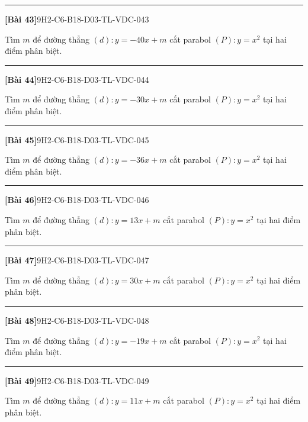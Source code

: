 \documentclass[12pt,a4paper]{article}
\newif\ifloigiai
\newenvironment{cauhoi}[2]{%
  \par\medskip\noindent\rule{\textwidth}{0.4pt}\par\nopagebreak
  \noindent\textbf{[#1]}\hfill{\scriptsize\ttfamily #2}\par\nopagebreak\smallskip}{\par}
\newcommand{\loigiai}[1]{\ifloigiai\par\smallskip\noindent\textit{Lời giải.} #1\par\fi}
\begin{document}
\begin{cauhoi}{Bài 43}{9H2-C6-B18-D03-TL-VDC-043}
Tìm $m$ để đường thẳng $(d): y=-40x+m$ cắt parabol $(P): y=x^{2}$ tại hai điểm phân biệt.
\loigiai{Phương trình hoành độ giao điểm $x^{2}+40x-m=0$. Để $(d)$ cắt $(P)$ tại hai điểm phân biệt cần $\Delta=1600+4m>0$, suy ra $m>-400$.}
\end{cauhoi}
\begin{cauhoi}{Bài 44}{9H2-C6-B18-D03-TL-VDC-044}
Tìm $m$ để đường thẳng $(d): y=-30x+m$ cắt parabol $(P): y=x^{2}$ tại hai điểm phân biệt.
\loigiai{Phương trình hoành độ giao điểm $x^{2}+30x-m=0$. Để $(d)$ cắt $(P)$ tại hai điểm phân biệt cần $\Delta=900+4m>0$, suy ra $m>-225$.}
\end{cauhoi}
\begin{cauhoi}{Bài 45}{9H2-C6-B18-D03-TL-VDC-045}
Tìm $m$ để đường thẳng $(d): y=-36x+m$ cắt parabol $(P): y=x^{2}$ tại hai điểm phân biệt.
\loigiai{Phương trình hoành độ giao điểm $x^{2}+36x-m=0$. Để $(d)$ cắt $(P)$ tại hai điểm phân biệt cần $\Delta=1296+4m>0$, suy ra $m>-324$.}
\end{cauhoi}
\begin{cauhoi}{Bài 46}{9H2-C6-B18-D03-TL-VDC-046}
Tìm $m$ để đường thẳng $(d): y=13x+m$ cắt parabol $(P): y=x^{2}$ tại hai điểm phân biệt.
\loigiai{Phương trình hoành độ giao điểm $x^{2}-13x-m=0$. Để $(d)$ cắt $(P)$ tại hai điểm phân biệt cần $\Delta=169+4m>0$, suy ra $m>-\dfrac{169}{4}$.}
\end{cauhoi}
\begin{cauhoi}{Bài 47}{9H2-C6-B18-D03-TL-VDC-047}
Tìm $m$ để đường thẳng $(d): y=30x+m$ cắt parabol $(P): y=x^{2}$ tại hai điểm phân biệt.
\loigiai{Phương trình hoành độ giao điểm $x^{2}-30x-m=0$. Để $(d)$ cắt $(P)$ tại hai điểm phân biệt cần $\Delta=900+4m>0$, suy ra $m>-225$.}
\end{cauhoi}
\begin{cauhoi}{Bài 48}{9H2-C6-B18-D03-TL-VDC-048}
Tìm $m$ để đường thẳng $(d): y=-19x+m$ cắt parabol $(P): y=x^{2}$ tại hai điểm phân biệt.
\loigiai{Phương trình hoành độ giao điểm $x^{2}+19x-m=0$. Để $(d)$ cắt $(P)$ tại hai điểm phân biệt cần $\Delta=361+4m>0$, suy ra $m>-\dfrac{361}{4}$.}
\end{cauhoi}
\begin{cauhoi}{Bài 49}{9H2-C6-B18-D03-TL-VDC-049}
Tìm $m$ để đường thẳng $(d): y=11x+m$ cắt parabol $(P): y=x^{2}$ tại hai điểm phân biệt.
\loigiai{Phương trình hoành độ giao điểm $x^{2}-11x-m=0$. Để $(d)$ cắt $(P)$ tại hai điểm phân biệt cần $\Delta=121+4m>0$, suy ra $m>-\dfrac{121}{4}$.}
\end{cauhoi}
\end{document}
